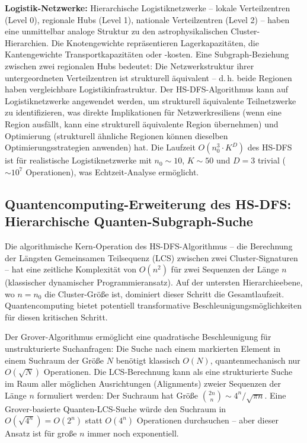﻿\documentclass[a4paper,12pt]{report}
\theoremstyle{definition}
\begin{document}
\textbf{Logistik-Netzwerke:} Hierarchische Logistiknetzwerke -- lokale Verteilzentren (Level 0), regionale Hubs (Level 1), nationale Verteilzentren (Level 2) -- haben eine unmittelbar analoge Struktur zu den astrophysikalischen Cluster-Hierarchien. Die Knotengewichte repräsentieren Lagerkapazitäten, die Kantengewichte Transportkapazitäten oder -kosten. Eine Subgraph-Beziehung zwischen zwei regionalen Hubs bedeutet: Die Netzwerkstruktur ihrer untergeordneten Verteilzentren ist strukturell äquivalent -- d.\,h. beide Regionen haben vergleichbare Logistikinfrastruktur. Der HS-DFS-Algorithmus kann auf Logistiknetzwerke angewendet werden, um strukturell äquivalente Teilnetzwerke zu identifizieren, was direkte Implikationen für Netzwerkresiliens (wenn eine Region ausfällt, kann eine strukturell äquivalente Region übernehmen) und Optimierung (strukturell ähnliche Regionen können dieselben Optimierungsstrategien anwenden) hat. Die Laufzeit $O(n_0^3 \cdot K^D)$ des HS-DFS ist für realistische Logistiknetzwerke mit $n_0 \sim 10$, $K \sim 50$ und $D = 3$ trivial ($\sim 10^7$ Operationen), was Echtzeit-Analyse ermöglicht.

\subsection{Quantencomputing-Erweiterung des HS-DFS: Hierarchische Quanten-Subgraph-Suche}

Die algorithmische Kern-Operation des HS-DFS-Algorithmus -- die Berechnung der Längsten Gemeinsamen Teilsequenz (LCS) zwischen zwei Cluster-Signaturen -- hat eine zeitliche Komplexität von $O(n^2)$ für zwei Sequenzen der Länge $n$ (klassischer dynamischer Programmieransatz). Auf der untersten Hierarchieebene, wo $n = n_0$ die Cluster-Größe ist, dominiert dieser Schritt die Gesamtlaufzeit. Quantencomputing bietet potentiell transformative Beschleunigungsmöglichkeiten für diesen kritischen Schritt.

Der Grover-Algorithmus \cite{grover1996} ermöglicht eine quadratische Beschleunigung für unstrukturierte Suchanfragen: Die Suche nach einem markierten Element in einem Suchraum der Größe $N$ benötigt klassisch $O(N)$, quantenmechanisch nur $O(\sqrt{N})$ Operationen. Die LCS-Berechnung kann als eine strukturierte Suche im Raum aller möglichen Ausrichtungen (Alignments) zweier Sequenzen der Länge $n$ formuliert werden: Der Suchraum hat Größe $\binom{2n}{n} \sim 4^n / \sqrt{\pi n}$. Eine Grover-basierte Quanten-LCS-Suche würde den Suchraum in $O(\sqrt{4^n}) = O(2^n)$ statt $O(4^n)$ Operationen durchsuchen -- aber dieser Ansatz ist für große $n$ immer noch exponentiell.
\end{document}
